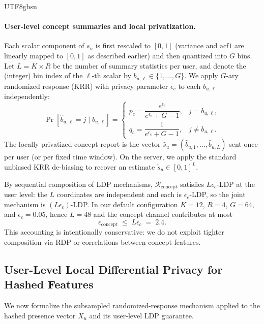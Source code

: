\documentclass[lettersize,journal]{IEEEtran}
\begin{document}
\begin{CJK*}{UTF8}{gbsn}
\paragraph{User-level concept summaries and local privatization.}
Each scalar component of $s_u$ is first rescaled to $[0,1]$ (variance and $\mathrm{acf1}$ are linearly mapped to $[0,1]$ as described earlier) and then quantized into $G$ bins. Let $L = K \times R$ be the number of summary statistics per user, and denote the (integer) bin index of the $\ell$-th scalar by $b_{u,\ell} \in \{1,\dots,G\}$. We apply $G$-ary randomized response (KRR) with privacy parameter $\epsilon_c$ to each $b_{u,\ell}$ independently:
\begin{equation}
  \Pr[\hat{b}_{u,\ell} = j \mid b_{u,\ell}]
  = \begin{cases}
      p_c = \dfrac{e^{\epsilon_c}}{e^{\epsilon_c} + G - 1}, & j = b_{u,\ell},\\[0.6ex]
      q_c = \dfrac{1}{e^{\epsilon_c} + G - 1}, & j \neq b_{u,\ell}.
    \end{cases}
\end{equation}
The locally privatized concept report is the vector
$\hat{s}_u = (\hat{b}_{u,1},\dots,\hat{b}_{u,L})$ sent once per user (or per fixed time window). On the server, we apply the standard unbiased KRR de-biasing to recover an estimate $\tilde{s}_u \in [0,1]^L$.

By sequential composition of LDP mechanisms, $\mathcal{R}_{\text{concept}}$ satisfies $L\epsilon_c$-LDP at the user level: the $L$ coordinates are independent and each is $\epsilon_c$-LDP, so the joint mechanism is $(L\epsilon_c)$-LDP. In our default configuration $K{=}12$, $R{=}4$, $G{=}64$, and $\epsilon_c{=}0.05$, hence $L{=}48$ and the concept channel contributes at most
\begin{equation}
  \epsilon_{\text{concept}} \;\le\; L \epsilon_c \;=\; 2.4.
\end{equation}
This accounting is intentionally conservative: we do not exploit tighter composition via RDP or correlations between concept features.



\subsection{User-Level Local Differential Privacy for Hashed Features}
\label{sec:ldp}

We now formalize the subsampled randomized-response mechanism applied to the hashed presence vector $X_u$ and its user-level LDP guarantee.


\end{CJK*}
\end{document}
